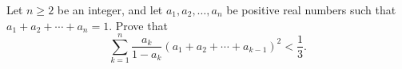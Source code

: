 Let $n \geq 2$ be an integer, and let $a_1,a_2,\ldots,a_n$ be positive real numbers such that $a_1+a_2+\cdots+a_n=1$. Prove that
\[ \sum_{k=1}^{n} \frac{a_k}{1-a_k}(a_1+a_2+\cdots+a_{k-1})^2 < \frac{1}{3}. \]
